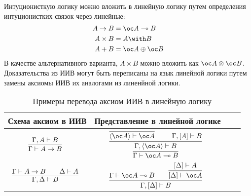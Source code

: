 Интуционисткую логику можно вложить в линейную логику путем определения интуционистких связок через линейные:
\begin{align*}
    A \to B &= \oc A \multimap B \\
    A \times B      &= A \with B \\
    A + B           &= \oc A \oplus \oc B
\end{align*}
В качестве альтернативного варианта, $A \times B$ можно вложить как $\oc A \otimes \oc B$.
Доказательства из ИИВ могут быть переписаны на язык линейной логики путем замены аксиомы ИИВ их аналогами из линенйной логики.
\begin{table}
\centering
\begin{tabular}{Sc Sc} \toprule
	Схема аксиом в ИИВ & Представление в линейной логике \\ \midrule
	$\infer[]{\Gamma \vdash A \to B}{\Gamma, A \vdash B}$ &
	$\infer[]{\Gamma \vdash \oc A \multimap B}{
		\infer[]{\Gamma, \pair{\oc A} \vdash B}{
			\infer[]{\pair{\oc A} \vdash \oc A}{} && \Gamma, [A] \vdash B
		}
	}$ \\ \midrule
	$\infer[]{\Gamma, \Delta \vdash B}{\Gamma \vdash A \to B && \Delta \vdash A}$ &
	$\infer[]{\Gamma, [\Delta] \vdash B}{
		\Gamma \vdash \oc A \multimap B && \infer[]{[\Delta] \vdash \oc A}{[\Delta] \vdash A}
	}$ \\ \bottomrule
\end{tabular}
\caption{Примеры перевода аксиом ИИВ в линейную логику}
\label{intutionistic-axioms-to-linear-samples}
\end{table}
